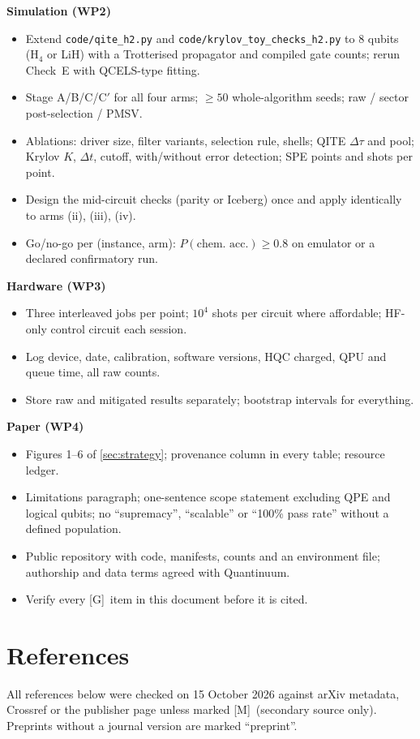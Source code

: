 \documentclass[11pt,a4paper]{article}
\newcommand{\lG}{\textcolor{alertred}{[G]}}  %
\newcommand{\lM}{\textcolor{alertred}{[M]}}  %
\begin{document}
\textbf{Simulation (WP2)}
\begin{itemize}
\item[$\square$] Extend \texttt{code/qite\_h2.py} and \texttt{code/krylov\_toy\_checks\_h2.py} to 8 qubits (H$_4$ or LiH) with a Trotterised propagator and compiled gate counts; rerun Check~E with QCELS-type fitting.
\item[$\square$] Stage A/B/C/C$'$ for all four arms; $\ge50$ whole-algorithm seeds; raw / sector post-selection / PMSV.
\item[$\square$] Ablations: driver size, filter variants, selection rule, shells; QITE $\Delta\tau$ and pool; Krylov $K$, $\Delta t$, cutoff, with/without error detection; SPE points and shots per point.
\item[$\square$] Design the mid-circuit checks (parity or Iceberg) once and apply identically to arms (ii), (iii), (iv).
\item[$\square$] Go/no-go per (instance, arm): $P(\text{chem.\ acc.})\ge0.8$ on emulator or a declared confirmatory run.
\end{itemize}
\textbf{Hardware (WP3)}
\begin{itemize}
\item[$\square$] Three interleaved jobs per point; $10^4$ shots per circuit where affordable; HF-only control circuit each session.
\item[$\square$] Log device, date, calibration, software versions, HQC charged, QPU and queue time, all raw counts.
\item[$\square$] Store raw and mitigated results separately; bootstrap intervals for everything.
\end{itemize}
\textbf{Paper (WP4)}
\begin{itemize}
\item[$\square$] Figures 1--6 of \cref{sec:strategy}; provenance column in every table; resource ledger.
\item[$\square$] Limitations paragraph; one-sentence scope statement excluding QPE and logical qubits; no ``supremacy'', ``scalable'' or ``100\% pass rate'' without a defined population.
\item[$\square$] Public repository with code, manifests, counts and an environment file; authorship and data terms agreed with Quantinuum.
\item[$\square$] Verify every \lG\ item in this document before it is cited.
\end{itemize}

\section*{References}\label{sec:refs}
All references below were checked on 15 October 2026 against arXiv metadata, Crossref or the publisher page unless marked \lM\ (secondary source only). Preprints without a journal version are marked ``preprint''.
\end{document}
